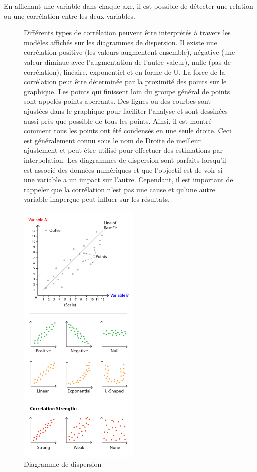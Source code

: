 \documentclass[french, a4paper, 12pt]{report}
\begin{document}
En affichant une variable dans chaque axe, il est possible de détecter une relation ou une corrélation entre les deux variables.
\begin{figure}[!htb]
\begin{minipage}{0.46\linewidth}
Différents types de corrélation peuvent être interprétés à travers les modèles affichés sur les diagrammes de dispersion. Il existe une corrélation positive (les valeurs augmentent ensemble), négative (une valeur diminue avec l’augmentation de l'autre valeur), nulle (pas de corrélation), linéaire, exponentiel et en forme de U. La force de la corrélation peut être déterminée par la proximité des points sur le graphique. Les points qui finissent loin du groupe général de points sont appelés points aberrants.
Des lignes ou des courbes sont ajustées dans le graphique pour faciliter l'analyse et sont dessinées aussi près que possible de tous les points. Ainsi, il est montré comment tous les points ont été condensés en une seule droite. Ceci est généralement connu sous le nom de Droite de meilleur ajustement et peut être utilisé pour effectuer des estimations par interpolation.
Les diagrammes de dispersion sont parfaits lorsqu’il est associé des données numériques et que l’objectif est de voir si une variable a un impact sur l'autre. Cependant, il est important de rappeler que la corrélation n'est pas une cause et qu'une autre variable inaperçue peut influer sur les résultats.
\end{minipage}\hfil
\begin{minipage}{0.35\linewidth}
    \includegraphics[height=13cm]{images/scatter-plot.png}
    \caption{\small Diagramme de dispersion}
 \label{fig:2.2}
\end{minipage}
\end{figure}
\end{document}
